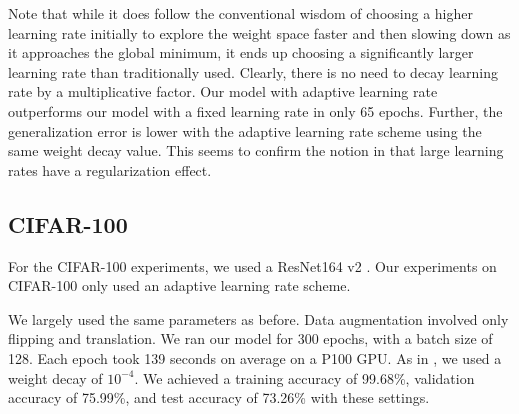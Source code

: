 \documentclass{article}
\begin{document}
Note that while it does follow the conventional wisdom of choosing a higher learning rate initially to explore the weight space faster and then slowing down as it approaches the global minimum, it ends up choosing a significantly larger learning rate than traditionally used. Clearly, there is no need to decay learning rate by a multiplicative factor. Our model with adaptive learning rate outperforms our model with a fixed learning rate in only 65 epochs. Further, the generalization error is lower with the adaptive learning rate scheme using the same weight decay value. This seems to confirm the notion in \cite{smith2017super} that large learning rates have a regularization effect.

\subsection{CIFAR-100}
For the CIFAR-100 experiments, we used a ResNet164 v2 \cite{he2016identity}. Our experiments on CIFAR-100 only used an adaptive learning rate scheme.

We largely used the same parameters as before. Data augmentation involved only flipping and translation. We ran our model for 300 epochs, with a batch size of 128. Each epoch took 139 seconds on average on a P100 GPU. As in \cite{he2016identity}, we used a weight decay of $10^{-4}$. We achieved a training accuracy of 99.68\%, validation accuracy of 75.99\%, and test accuracy of 73.26\% with these settings.
\end{document}
